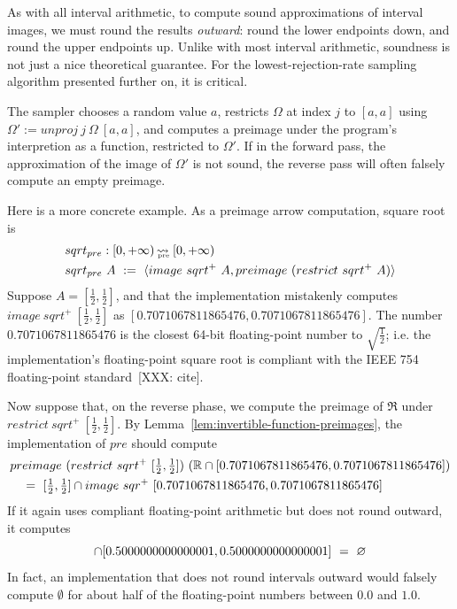 As with all interval arithmetic, to compute sound approximations of interval images, we must round the results \emph{outward}: round the lower endpoints down, and round the upper endpoints up.
Unlike with most interval arithmetic, soundness is not just a nice theoretical guarantee.
For the lowest-rejection-rate sampling algorithm presented further on, it is critical.

The sampler chooses a random value $a$, restricts $\Omega$ at index $j$ to $[a,a]$ using $\Omega' := unproj~j~\Omega~[a,a]$, and computes a preimage under the program's interpretion as a function, restricted to $\Omega'$.
If in the forward pass, the approximation of the image of $\Omega'$ is not sound, the reverse pass will often falsely compute an empty preimage.

Here is a more concrete example.
As a preimage arrow computation, square root is
\begin{equation}
\begin{aligned}
	&sqrt_{pre} : [0,+\infty) \operatorname{\rightsquigarrow_{\mspace{-20mu}_\mathrm{pre}}}\,[0,+\infty) \\
	&sqrt_{pre}~A\ :=\ \langle{image~sqrt^+~A, preimage~(restrict~sqrt^+~A)}\rangle
\end{aligned}
\end{equation}
Suppose $A = [\frac{1}{2},\frac{1}{2}]$, and that the implementation mistakenly computes $image~sqrt^+~[\frac{1}{2},\frac{1}{2}]$ as $[0.7071067811865476,0.7071067811865476]$.
The number $0.7071067811865476$ is the closest 64-bit floating-point number to $\sqrt{\frac{1}{2}}$; i.e. the implementation's floating-point square root is compliant with the IEEE 754 floating-point standard~[XXX: cite].

Now suppose that, on the reverse phase, we compute the preimage of $\Re$ under $restrict~sqrt^+~[\frac{1}{2},\frac{1}{2}]$.
By Lemma~\ref{lem:invertible-function-preimages}, the implementation of $pre$ should compute
\begin{equation}
\begin{aligned}
	&preimage~(restrict~sqrt^+~[\tfrac{1}{2},\tfrac{1}{2}])~(\mathbb{R} \cap [0.7071067811865476,0.7071067811865476])
\\
	&\ \ \ =\ [\tfrac{1}{2},\tfrac{1}{2}] \cap image~sqr^+~[0.7071067811865476,0.7071067811865476]
\end{aligned}
\end{equation}
If it again uses compliant floating-point arithmetic but does not round outward, it computes
\begin{equation}
	[\tfrac{1}{2},\tfrac{1}{2}] \i [0.5000000000000001,0.5000000000000001]\ =\ \emptyset
\end{equation}
In fact, an implementation that does not round intervals outward would falsely compute $\emptyset$ for about half of the floating-point numbers between $0.0$ and $1.0$.

